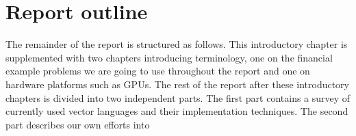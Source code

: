 %
%



\section{Report outline}
The remainder of the report is structured as follows. This
introductory chapter is supplemented with two chapters introducing
terminology, one on the financial example problems we are going to use
throughout the report and one on hardware platforms such as GPUs. The
rest of the report after these introductory chapters is divided into
two independent parts. The first part contains a survey of currently
used vector languages and their implementation techniques. The second
part describes our own efforts into \todo{\ldots}


